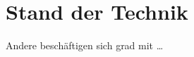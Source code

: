 \section{Stand der Technik}
\label{sec:relatedwork}
    
    Andere beschäftigen sich grad mit \ldots


